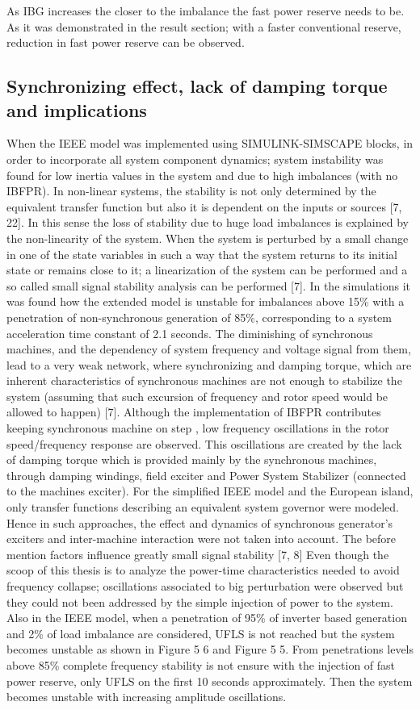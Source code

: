 As IBG increases the closer to the imbalance the fast power reserve needs to be. As it was demonstrated in the result section; with a faster conventional reserve, reduction in fast power reserve can be observed.
\subsection{Synchronizing effect, lack of damping torque and implications}

When the IEEE model was implemented using SIMULINK-SIMSCAPE blocks, in order to incorporate all system component dynamics; system instability was found for low inertia values in the system and due to high imbalances (with no IBFPR). In non-linear systems, the stability is not only determined by the equivalent transfer function but also it is dependent on the inputs or sources [7, 22]. In this sense the loss of stability due to huge load imbalances is explained by the non-linearity of the system. When the system is perturbed by a small change in one of the state variables in such a way that the system returns to its initial state or remains close to it; a linearization of the system can be performed and a so called small signal stability analysis can be performed [7].
In the simulations it was found how the extended model is unstable for imbalances above 15\% with a penetration of non-synchronous generation of 85\%, corresponding to a system acceleration time constant of 2.1 seconds. The diminishing of synchronous machines, and the dependency of system frequency and voltage signal from them, lead to a very weak network, where synchronizing and damping torque, which are inherent characteristics of synchronous machines are not enough to stabilize the system (assuming that such excursion of frequency and rotor speed would be allowed to happen) [7]. Although the implementation of IBFPR contributes keeping synchronous machine on step , low frequency oscillations in the rotor speed/frequency response are observed. This oscillations are created by the lack of damping torque which is provided mainly by the synchronous machines, through damping windings, field exciter and Power System Stabilizer (connected to the machines exciter). For the simplified IEEE model and the European island, only transfer functions describing an equivalent system governor were modeled. Hence in such approaches, the effect and dynamics of synchronous generator’s exciters and inter-machine interaction were not taken into account. The before mention factors influence greatly small signal stability [7, 8]
Even though the scoop of this thesis is to analyze the power-time characteristics needed to avoid frequency collapse; oscillations associated to big perturbation were observed but they could not been addressed by the simple injection of power to the system. Also in the IEEE model, when a penetration of 95\% of inverter based generation and 2\% of load imbalance are considered, UFLS is not reached but the system becomes unstable as shown in Figure 5 6 and Figure 5 5. From penetrations levels above 85\% complete frequency stability is not ensure with the injection of fast power reserve, only UFLS on the first 10 seconds approximately. Then the system becomes unstable with increasing amplitude oscillations.

